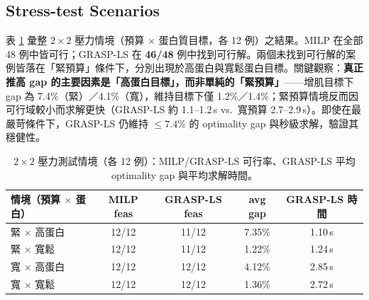 \documentclass[a4paper]{article}
\begin{document}
\subsection{Stress-test Scenarios}\label{sec:stress}
表 \ref{tab:stress} 彙整 $2\times2$ 壓力情境（預算 $\times$ 蛋白質目標，各 12 例）之結果。MILP 在全部 48 例中皆可行；GRASP-LS 在 \textbf{46/48} 例中找到可行解。兩個未找到可行解的案例皆落在「緊預算」條件下，分別出現於高蛋白與寬鬆蛋白目標。關鍵觀察：\textbf{真正推高 gap 的主要因素是「高蛋白目標」，而非單純的「緊預算」}——增肌目標下 gap 為 7.4\%（緊）／4.1\%（寬），維持目標下僅 1.2\%／1.4\%；緊預算情境反而因可行域較小而求解更快（GRASP-LS 約 1.1--1.2\,s vs.\ 寬預算 2.7--2.9\,s）。即使在最嚴苛條件下，GRASP-LS 仍維持 $\le 7.4\%$ 的 optimality gap 與秒級求解，驗證其穩健性。
\begin{table}[h]
\centering\small
\caption{$2\times2$ 壓力測試情境（各 12 例）：MILP/GRASP-LS 可行率、GRASP-LS 平均 optimality gap 與平均求解時間。}
\label{tab:stress}
\begin{tabular}{lcccc}
\toprule
情境（預算 $\times$ 蛋白） & MILP feas & GRASP-LS feas & avg gap & GRASP-LS 時間 \\
\midrule
緊 $\times$ 高蛋白 & 12/12 & 11/12 & 7.35\% & 1.10\,s \\
緊 $\times$ 寬鬆   & 12/12 & 11/12 & 1.22\% & 1.24\,s \\
寬 $\times$ 高蛋白 & 12/12 & 12/12 & 4.12\% & 2.85\,s \\
寬 $\times$ 寬鬆   & 12/12 & 12/12 & 1.36\% & 2.72\,s \\
\bottomrule
\end{tabular}
\end{table}
\end{document}

